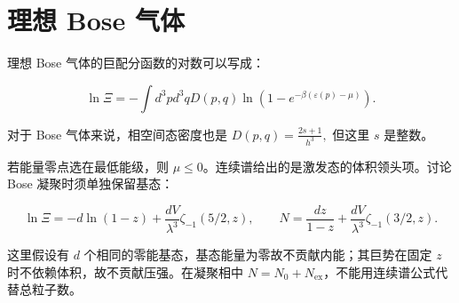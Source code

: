 \section{理想 Bose 气体}
理想 Bose 气体的巨配分函数的对数可以写成：
\begin{linenomath}\begin{equation}
    \ln \varXi = -\int d^3p d^3 q D(p,q)\ln \left( 1 - e^{-\beta(\varepsilon(p) - \mu)} \right).
\end{equation}\end{linenomath}
对于 Bose 气体来说，相空间态密度也是 $D(p,q) = \frac{2s+1}{h^3},$ 但这里 $s$ 是整数。





若能量零点选在最低能级，则 $\mu\leq0$。连续谱给出的是激发态的体积领头项。讨论 Bose 凝聚时须单独保留基态：
\begin{linenomath}\begin{equation}
 \ln\varXi=-d\ln(1-z)+\frac{dV}{\lambda^3}\zeta_{-1}(5/2,z),\qquad
 N=\frac{dz}{1-z}+\frac{dV}{\lambda^3}\zeta_{-1}(3/2,z).
\end{equation}\end{linenomath}
这里假设有 $d$ 个相同的零能基态，基态能量为零故不贡献内能；其巨势在固定 $z$ 时不依赖体积，故不贡献压强。在凝聚相中 $N=N_0+N_{\mathrm{ex}}$，不能用连续谱公式代替总粒子数。
